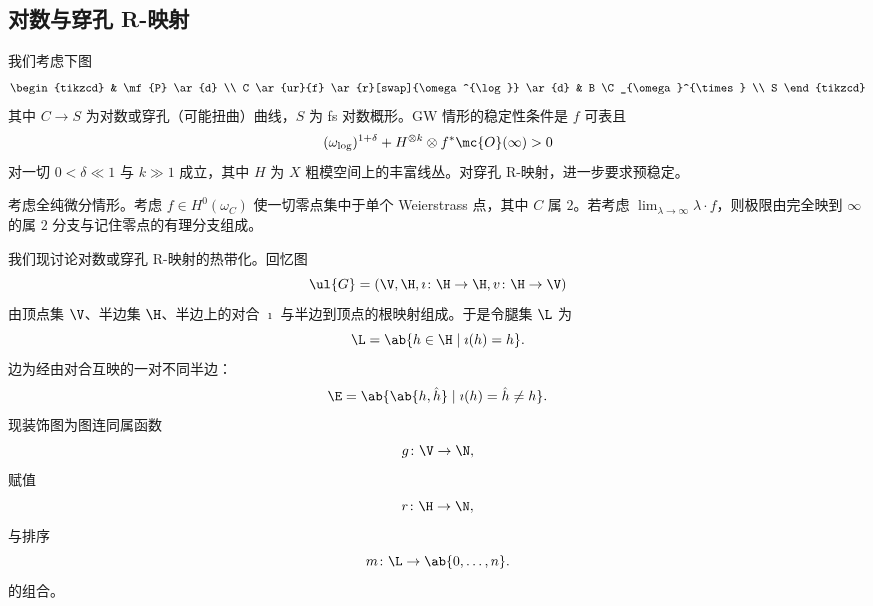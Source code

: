 \subsection{对数与穿孔 R-映射}%
\label{sub:Log and punctured R-maps}

我们考虑下图
\begin{equation*}
\begin{tikzcd}
    & \mf{P} \ar{d} \\
    C \ar{ur}{f} \ar{r}[swap]{\omega^{\log}} \ar{d} & B \C_{\omega}^{\times} \\
    S
\end{tikzcd}
\end{equation*}
其中 \(C \to S\) 为对数或穿孔（可能扭曲）曲线，\(S\) 为 fs 对数概形。GW 情形的稳定性条件是 \(f\) 可表且
\[ (\omega_{\log})^{1+\delta} + H^{\otimes k} \otimes f^* \mc{O}(\infty) > 0 \]
对一切 \(0 < \delta \ll 1\) 与 \(k \gg 1\) 成立，其中 \(H\) 为 \(X\) 粗模空间上的丰富线丛。对穿孔 R-映射，进一步要求预稳定。

\begin{exm}
    考虑全纯微分情形。考虑 \(f \in H^0(\omega_C)\) 使一切零点集中于单个 Weierstrass 点，其中 \(C\) 属 \(2\)。若考虑 \(\lim_{\lambda \to \infty} \lambda \cdot f\)，则极限由完全映到 \(\infty\) 的属 \(2\) 分支与记住零点的有理分支组成。
\end{exm}

我们现讨论对数或穿孔 R-映射的热带化。回忆图
\[ \ul{G} = (\V, \H, \imath \colon \H \to \H, v \colon \H \to \V) \]
由顶点集 \(\V\)、半边集 \(\H\)、半边上的对合 \(\imath\) 与半边到顶点的根映射组成。于是令腿集 \(\L\) 为
\[ \L = \ab\{ h \in \H \mid \imath(h) = h\}. \]
边为经由对合互映的一对不同半边：
\[ \E = \ab\{ \ab\{h, \hat{h}\} \mid \imath(h) = \hat{h} \neq h \}. \]
现装饰图为图连同属函数
\[ g \colon \V \to \N, \]
赋值
\[ r \colon \H \to \N, \]
与排序
\[ m \colon \L \to \ab\{0, \ldots, n\}. \]
的组合。


